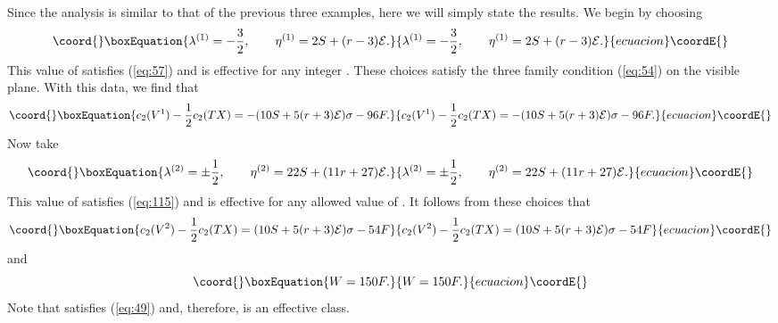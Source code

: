\documentclass[a4paper,12pt]{article}
\numberwithin{equation}{section}
\theoremstyle{plain}
\begin{document}
Since the analysis is similar to that of the previous three examples, here we
will simply state the results. We begin by choosing
%
\begin{equation}\coord{}\boxEquation{
\lambda^{(1)}=-\frac{3}{2}, \qquad \eta^{(1)}=2S+(r-3){\cal{E}}.
\label{eq:116}
}{
\lambda^{(1)}=-\frac{3}{2}, \qquad \eta^{(1)}=2S+(r-3){\cal{E}}.
}{ecuacion}\coordE{}\end{equation}
%
This value of \coordHE{} satisfies (\ref{eq:57}) and \coordHE{} is
effective for any integer \coordHE{}. These choices satisfy the three family
condition (\ref{eq:54}) on the visible plane. With this data, we find that
%
\begin{equation}\coord{}\boxEquation{
c_{2}(V^{1})-\frac{1}{2}c_{2}(TX)=-(10S+5(r+3){\cal{E}})\sigma-96F.
\label{eq:117}
}{
c_{2}(V^{1})-\frac{1}{2}c_{2}(TX)=-(10S+5(r+3){\cal{E}})\sigma-96F.
}{ecuacion}\coordE{}\end{equation}
%
Now take
\begin{equation}\coord{}\boxEquation{
\lambda^{(2)}=\pm\frac{1}{2}, \qquad \eta^{(2)}=22S+(11r+27){\cal{E}}.
\label{eq:118}
}{
\lambda^{(2)}=\pm\frac{1}{2}, \qquad \eta^{(2)}=22S+(11r+27){\cal{E}}.
}{ecuacion}\coordE{}\end{equation}
%
This value of \coordHE{} satisfies (\ref{eq:115}) and \coordHE{} is
effective for any allowed value of \coordHE{}. It follows from these choices that
%
\begin{equation}\coord{}\boxEquation{
c_{2}(V^{2})-\frac{1}{2}c_{2}(TX)=(10S+5(r+3){\cal{E}})\sigma-54F
\label{eq:119}
}{
c_{2}(V^{2})-\frac{1}{2}c_{2}(TX)=(10S+5(r+3){\cal{E}})\sigma-54F
}{ecuacion}\coordE{}\end{equation}
%
and
%
\begin{equation}\coord{}\boxEquation{
W=150F.
\label{eq:120}
}{
W=150F.
}{ecuacion}\coordE{}\end{equation}
%
Note that \coordHE{} satisfies (\ref{eq:49}) and, therefore, is an effective class.
\end{document}
